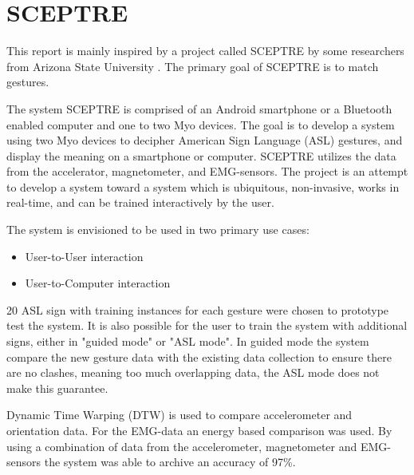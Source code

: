 \section{SCEPTRE}
\label{sec:sceptre}
This report is mainly inspired by a project called SCEPTRE by some researchers from Arizona State University \cite{paudyal2016sceptre}. The primary goal of SCEPTRE is to match gestures.

The system SCEPTRE is comprised of an Android smartphone or a Bluetooth enabled computer and one to two Myo devices. The goal is to develop a system using two Myo devices to decipher American Sign Language (ASL) gestures, and display the meaning on a smartphone or computer. SCEPTRE utilizes the data from the accelerator, magnetometer, and EMG-sensors. The project is an attempt to develop a system toward a system which is ubiquitous, non-invasive, works in real-time, and can be trained interactively by the user. 

The system is envisioned to be used in two primary use cases:
\begin{itemize}
    \item User-to-User interaction
    \item User-to-Computer interaction
\end{itemize}

20 ASL sign with training instances for each gesture were chosen to prototype test the system. It is also possible for the user to train the system with additional signs, either in "guided mode" or "ASL mode". In guided mode the system compare the new gesture data with the existing data collection to ensure there are no clashes, meaning too much overlapping data, the ASL mode does not make this guarantee.

Dynamic Time Warping (DTW) is used to compare accelerometer and orientation data. For the EMG-data an energy based comparison was used. By using a combination of data from the accelerometer, magnetometer and EMG-sensors the system was able to archive an accuracy of 97\%. 
